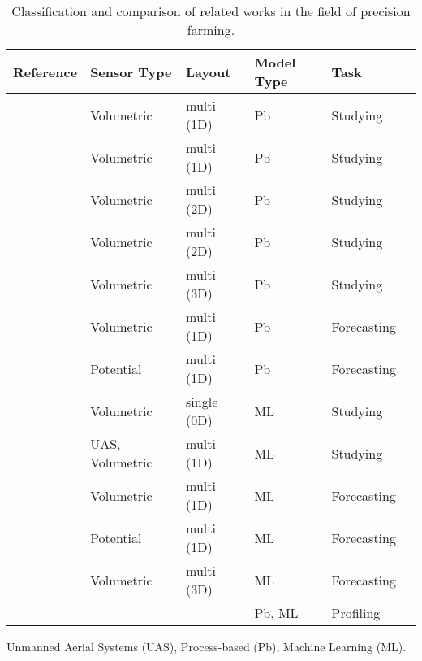 \begin{table}[t]
    \centering
    \footnotesize
    \caption{Classification and comparison of related works in the field of precision farming.}
    \begin{tabular}{llllll}
    \toprule
    Reference & Sensor Type & Layout & Model Type & Task \\ \midrule
    \cite{Pan2021}             & Volumetric      & multi (1D)    & Pb      & Studying  \\
    \cite{Li20152382}          & Volumetric      & multi (1D)    & Pb      & Studying  \\
    \cite{Egea2016197}         & Volumetric      & multi (2D)    & Pb      & Studying  \\
    \cite{Cordeiro2016139}     & Volumetric      & multi (2D)    & Pb      & Studying  \\
    \cite{Zapata-Sierra2021}   & Volumetric      & multi (3D)    & Pb      & Studying  \\
    \cite{chen2014spatial}     & Volumetric      & multi (1D)    & Pb      & Forecasting \\
    \cite{shein2019validation} & Potential       & multi (1D)    & Pb      & Forecasting \\
    \cite{arif2013estimation}  & Volumetric      & single (0D)   & ML       & Studying  \\
    \cite{Babaeian2021}        & UAS, Volumetric & multi (1D)    & ML       & Studying  \\
    \cite{Goldstein2018421}    & Volumetric      & multi (1D)    & ML       & Forecasting \\
    \cite{Jimenez20201327}     & Potential       & multi (1D)    & ML       & Forecasting \\
    \cite{Liang2021}           & Volumetric      & multi (3D)    & ML       & Forecasting \\
    \cite{Hinnell2010535}      & -               & -             & Pb, ML  & Profiling   \\
    \bottomrule
    \end{tabular}
    \begin{tablenotes}
    \scriptsize
    \item Unmanned Aerial Systems (UAS), Process-based (Pb), Machine Learning (ML).
    \end{tablenotes}
    \label{pluto-tbl:related}
\end{table}

